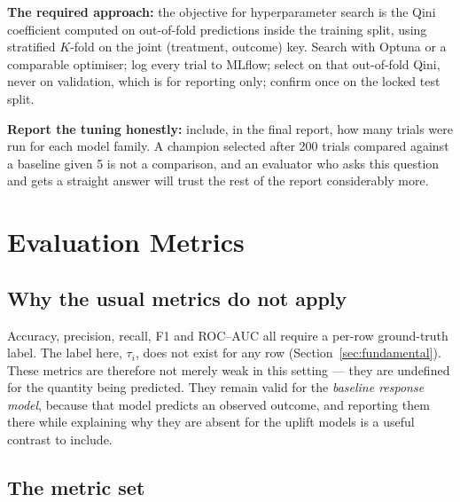 \documentclass[11pt,a4paper]{article}
\begin{document}
\textbf{The required approach:} the objective for hyperparameter search is the Qini coefficient
computed on out-of-fold predictions inside the training split, using stratified $K$-fold on the
joint (treatment, outcome) key. Search with Optuna or a comparable optimiser; log every trial to
MLflow; select on that out-of-fold Qini, never on validation, which is for reporting only; confirm
once on the locked test split.

\textbf{Report the tuning honestly:} include, in the final report, how many trials were run for each
model family. A champion selected after 200 trials compared against a baseline given 5 is not a
comparison, and an evaluator who asks this question and gets a straight answer will trust the rest of
the report considerably more.

\section{Evaluation Metrics}
\label{sec:metrics}

\subsection{Why the usual metrics do not apply}

Accuracy, precision, recall, F1 and ROC--AUC all require a per-row ground-truth label. The label
here, $\tau_i$, does not exist for any row (Section~\ref{sec:fundamental}). These metrics are
therefore not merely weak in this setting --- they are undefined for the quantity being predicted.
They remain valid for the \emph{baseline response model}, because that model predicts an observed
outcome, and reporting them there while explaining why they are absent for the uplift models is a
useful contrast to include.

\subsection{The metric set}
\end{document}
